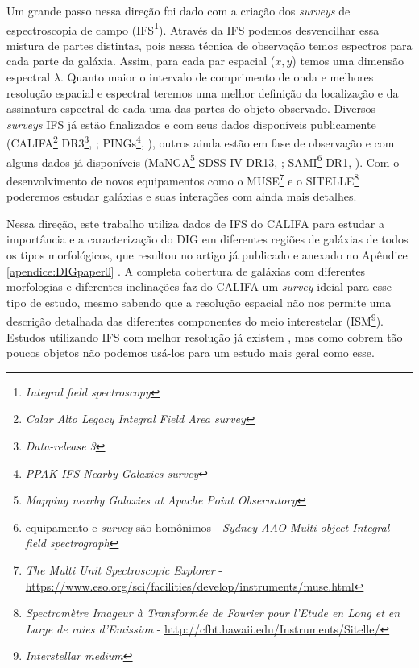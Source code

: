Um grande passo nessa direção foi dado com a criação dos {\em surveys} de espectroscopia de campo (IFS\footnote{{\em Integral field spectroscopy}}). Através da IFS podemos desvencilhar essa mistura de partes distintas, pois nessa técnica de observação temos espectros para cada parte da galáxia. Assim, para cada par espacial ($x,y$) temos uma dimensão espectral $\lambda$. Quanto maior o intervalo de comprimento de onda e melhores resolução espacial
e espectral teremos uma melhor definição da localização e da assinatura espectral de cada uma das partes do objeto observado. Diversos {\em surveys} IFS já estão finalizados e com seus dados disponíveis publicamente (CALIFA\footnote{\em Calar Alto Legacy Integral Field Area survey} DR3\footnote{\em Data-release 3}, \citealt{SFSanchez.DR3.2016}; PINGs\footnote{\em PPAK IFS Nearby Galaxies survey}, \citealt{RosalesOrtega.etal.2010}), outros ainda estão em fase de observação e com alguns dados já disponíveis (MaNGA\footnote{\em Mapping nearby Galaxies at Apache Point Observatory} SDSS-IV DR13, \citealt{MaNGADR1.2017}; SAMI\footnote{equipamento e {\em survey} são homônimos - {\em Sydney-AAO Multi-object Integral-field spectrograph}} DR1, \citealt{SAMIDR1.2017}). Com o desenvolvimento de novos equipamentos como o MUSE\footnote{{\em The Multi Unit Spectroscopic Explorer} - \href{https://www.eso.org/sci/facilities/develop/instruments/muse.html}{https://www.eso.org/sci/facilities/develop/instruments/muse.html}} e o SITELLE\footnote{{\em Spectromètre Imageur à Transformée de Fourier pour l'Etude en Long et en Large de raies d'Emission} - \href{http://cfht.hawaii.edu/Instruments/Sitelle/}{http://cfht.hawaii.edu/Instruments/Sitelle/}} poderemos estudar galáxias e suas interações com ainda mais detalhes.

Nessa direção, este trabalho utiliza dados de IFS do CALIFA para estudar a importância e a caracterização do DIG em diferentes regiões de galáxias de todos os tipos morfológicos, que resultou no artigo já publicado e anexado no Apêndice \ref{apendice:DIGpaper0} \citep{Lacerda.etal.2018}. A completa cobertura de galáxias com diferentes morfologias e diferentes inclinações faz do CALIFA um {\em survey} ideial para esse tipo de estudo, mesmo sabendo que a resolução espacial não nos permite uma descrição detalhada das diferentes componentes do meio interestelar (ISM\footnote{\em Interstellar medium}). Estudos utilizando IFS com melhor resolução já existem \citep{Sanchez.etal.2015MUSE, Vogt.etal.2017a, RousseauNepton.etal.2017}, mas como cobrem tão poucos objetos não podemos usá-los para um estudo mais geral como esse.


